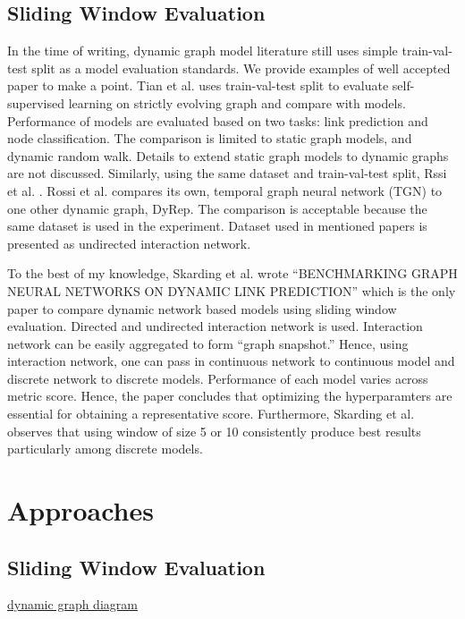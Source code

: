 \documentclass{IEEEtran}
\begin{document}
\subsection{Sliding Window Evaluation}
\label{sec:orgc93db96}

In the time of writing, dynamic graph model literature still uses simple train-val-test split as a model evaluation standards. We provide examples of well accepted paper to make a point. Tian et al. \cite{tian2021self} uses train-val-test split to evaluate self-supervised learning on strictly evolving graph and compare with models. Performance of models are evaluated based on two tasks: link prediction and node classification. The comparison is limited to static graph models, and dynamic random walk. Details to extend static graph models to dynamic graphs are not discussed. Similarly, using the same dataset and train-val-test split, Rssi et al. \cite{rossi2020temporal}. Rossi et al. compares its own, temporal graph neural network (TGN) to one other dynamic graph, DyRep. The comparison is acceptable because the same dataset is used in the experiment. Dataset used in mentioned papers is presented as undirected interaction network.

To the best of my knowledge, Skarding et al. wrote ``BENCHMARKING GRAPH NEURAL NETWORKS ON DYNAMIC LINK PREDICTION'' \cite{skarding2021benchmarking} which is the only paper to compare dynamic network based models using sliding window evaluation. Directed and undirected interaction network is used. Interaction network can be easily aggregated to form ``graph snapshot.'' Hence, using interaction network, one can pass in continuous network to continuous model and discrete network to discrete models. Performance of each model varies across metric score. Hence, the paper concludes that optimizing the hyperparamters are essential for obtaining a representative score. Furthermore, Skarding et al. observes that using window of size 5 or 10 consistently produce best results particularly among discrete models.

\section{Approaches}
\label{sec:org193b9ed}
\subsection{Sliding Window Evaluation}
\label{sec:orgcc18a4c}
\href{images/dynamic-graph-diagram.png}{dynamic graph diagram}
\end{document}

